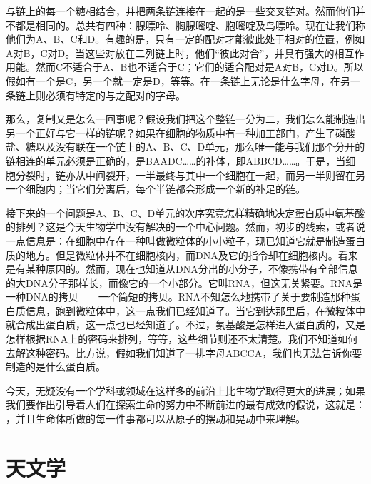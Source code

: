 与链上的每一个糖相结合，并把两条链连接在一起的是一些交叉链对。然而他们并不都是相同的。总共有四种：腺嘌呤、胸腺嘧啶、胞嘧啶及鸟嘌呤。现在让我们称他们为A、B、C和D。有趣的是，只有一定的配对才能彼此处于相对的位置，例如A对B，C对D。当这些对放在二列链上时，他们“彼此对合”，并具有强大的相互作用能。然而C不适合于A、B也不适合于C；它们的适合配对是A对B，C对D。所以假如有一个是C，另一个就一定是D，等等。在一条链上无论是什么字母，在另一条链上则必须有特定的与之配对的字母。

那么，复制又是怎么一回事呢？假设我们把这个整链一分为二，我们怎么能制造出另一个正好与它一样的链呢？如果在细胞的物质中有一种加工部门，产生了磷酸盐、糖以及没有联在一个链上的A、B、C、D单元，那么唯一能与我们那个分开的链相连的单元必须是正确的，是BAADC……的补体，即ABBCD……。于是，当细胞分裂时，链亦从中间裂开，一半最终与其中一个细胞在一起，而另一半则留在另一个细胞内；当它们分离后，每个半链都会形成一个新的补足的链。

接下来的一个问题是A、B、C、D单元的次序究竟怎样精确地决定蛋白质中氨基酸的排列？这是今天生物学中没有解决的一个中心问题。然而，初步的线索，或者说一点信息是：在细胞中存在一种叫做微粒体的小小粒子，现已知道它就是制造蛋白质的地方。但是微粒体并不在细胞核内，而DNA及它的指令却在细胞核内。看来是有某种原因的。然而，现在也知道从DNA分出的小分子，不像携带有全部信息的大DNA分子那样长，而像它的一个小部分。它叫RNA，但这无关紧要。RNA是一种DNA的拷贝——一个简短的拷贝。RNA不知怎么地携带了关于要制造那种蛋白质信息，跑到微粒体中，这一点我们已经知道了。当它到达那里后，在微粒体中就合成出蛋白质，这一点也已经知道了。不过，氨基酸是怎样进入蛋白质的，又是怎样根据RNA上的密码来排列，等等，这些细节则还不太清楚。我们不知道如何去解这种密码。比方说，假如我们知道了一排字母ABCCA，我们也无法告诉你要制造的是什么蛋白质。

今天，无疑没有一个学科或领域在这样多的前沿上比生物学取得更大的进展；如果我们要作出引导着人们在探索生命的努力中不断前进的最有成效的假说，这就是： ，并且生命体所做的每一件事都可以从原子的摆动和晃动中来理解。


\section{天文学}


